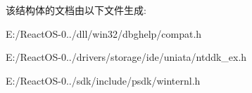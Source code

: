 该结构体的文档由以下文件生成\+:\begin{DoxyCompactItemize}
\item 
E\+:/\+React\+O\+S-\/0../dll/win32/dbghelp/compat.\+h\item 
E\+:/\+React\+O\+S-\/0../drivers/storage/ide/uniata/ntddk\+\_\+ex.\+h\item 
E\+:/\+React\+O\+S-\/0../sdk/include/psdk/winternl.\+h\end{DoxyCompactItemize}
